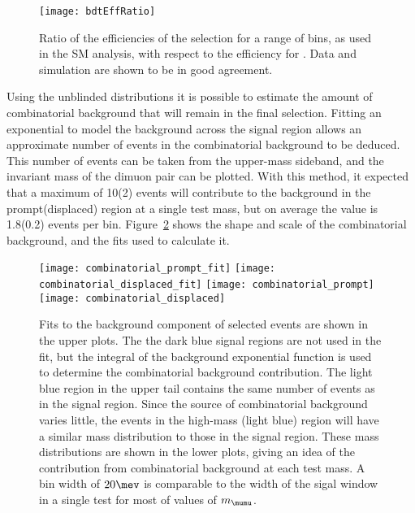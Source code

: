 \begin{figure}
  \begin{center}
    \texttt{[image: bdtEffRatio]}
    \caption[Efficiency ratios]
    {
      Ratio of the efficiencies of the \bdt selection for a range of \qsq bins, as used in the SM
      \btokstrmumu analysis, with respect to the efficiency for \decay{\Bd}{\jpsi\Kstarz}.
      Data and simulation are shown to be in good agreement.
    }
    \label{fig:bdtEffRatio}
  \end{center}
\end{figure}

Using the unblinded distributions it is possible to estimate the amount of combinatorial background
that will remain in the final selection.
Fitting an exponential to model the background across the signal region allows an approximate
number of events in the combinatorial background to be deduced.
This number of events can be taken from the upper-mass sideband, and the invariant mass of the
dimuon pair can be plotted.
With this method, it expected that a maximum of 10(2) events will contribute to the background in
the prompt(displaced) region at a single test mass, but on average the value is 1.8(0.2) events per
bin.
Figure~\ref{fig:db:comb} shows the shape and scale of the combinatorial background, and the fits
used to calculate it.

\begin{figure}
  \begin{center}
    \texttt{[image: combinatorial\_prompt\_fit]}
    \texttt{[image: combinatorial\_displaced\_fit]}
    \texttt{[image: combinatorial\_prompt]}
    \texttt{[image: combinatorial\_displaced]}
    \caption[Estimation of combinatorial background contribution]
    {
      Fits to the background component of selected \btokstrmumu events are shown in the upper
      plots.
      The the dark blue signal regions are not used in the fit, but the integral of the background
      exponential function is used to determine the combinatorial background contribution.
      The light blue region in the upper tail contains the same number of events as in the signal
      region.
      Since the source of combinatorial background varies little, the events in the high-mass
      (light blue) region will have a similar mass distribution to those in the signal region.
      These mass distributions are shown in the lower plots, giving an idea of the contribution
      from combinatorial background at each test mass.
      A bin width of $20\mev$ is comparable to the width of the sigal window in a single test for
      most of values of $m_{\mumu}$.
    }
    \label{fig:db:comb}
  \end{center}
\end{figure}



